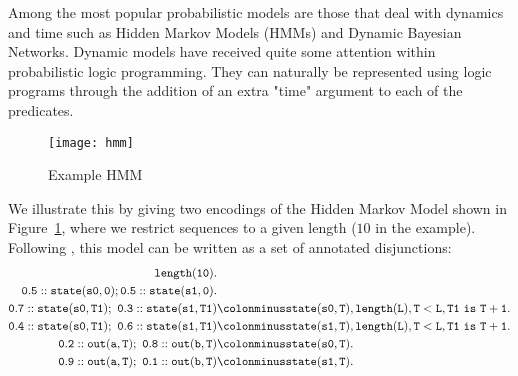 \documentclass[a4paper]{article}
\begin{document}
Among the most popular probabilistic models
are those that deal with dynamics and time such as Hidden Markov
Models (HMMs) and Dynamic Bayesian Networks.
Dynamic models have received quite some attention within probabilistic logic programming.
They can naturally be represented using logic programs through the addition of an extra
"time" argument to each of the predicates. 
\begin{figure}
\centering
\texttt{[image: hmm]}
\caption{Example HMM}
\label{fig:hmm}
\end{figure}
We illustrate this by giving two encodings of the Hidden Markov Model shown in
Figure~\ref{fig:hmm}, where we restrict sequences to a given length
($10$ in the example).  
Following \citet{Vennekens04}, this model can be written as a set of
annotated disjunctions:
\begin{align*}
\mathtt{length(10). }&\\
\mathtt{0.5::state(s0,0); 0.5::state(s1,0).}&\\
\mathtt{0.7::state(s0,T1);
  ~0.3::state(s1,T1)}&{\colonminus}\mathtt{state(s0,T),length(L), T<
  L, T1 ~ is ~ T+1.}\\
\mathtt{0.4::state(s0,T1); ~0.6::state(s1,T1)}&{\colonminus}\mathtt{state(s1,T), length(L), T< L, T1~ is ~T+1.}\\
\mathtt{0.2::out(a,T); ~ 0.8::out(b,T)}&{\colonminus}\mathtt{state(s0,T).}\\
\mathtt{0.9::out(a,T); ~ 0.1::out(b,T)}&{\colonminus}\mathtt{state(s1,T).}\\
\end{align*}
\end{document}
